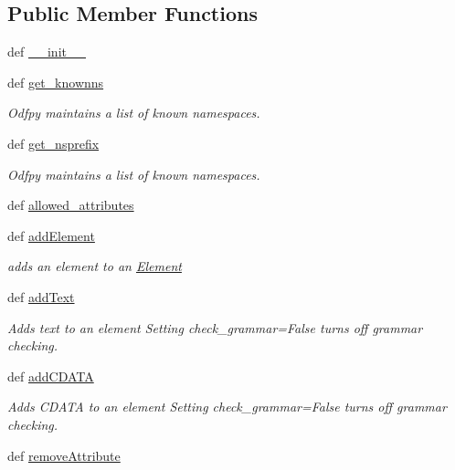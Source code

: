 \subsection*{Public Member Functions}
\begin{DoxyCompactItemize}
\item 
def \hyperlink{classodf_1_1element_1_1Element_aebb50570215d430236d8cfdaa41331d9}{\+\_\+\+\_\+init\+\_\+\+\_\+}
\item 
def \hyperlink{classodf_1_1element_1_1Element_a31ad0b6559d84f55ab508fef095bb2ed}{get\+\_\+knownns}
\begin{DoxyCompactList}\small\item\em Odfpy maintains a list of known namespaces. \end{DoxyCompactList}\item 
def \hyperlink{classodf_1_1element_1_1Element_af1c38c8bca58c0258075cb7a701e8858}{get\+\_\+nsprefix}
\begin{DoxyCompactList}\small\item\em Odfpy maintains a list of known namespaces. \end{DoxyCompactList}\item 
def \hyperlink{classodf_1_1element_1_1Element_aab7cbbc18e5d24d10b0128b6b45e6824}{allowed\+\_\+attributes}
\item 
def \hyperlink{classodf_1_1element_1_1Element_ae819fd7cab6f9cdd69fe886178bc6d10}{add\+Element}
\begin{DoxyCompactList}\small\item\em adds an element to an \hyperlink{classodf_1_1element_1_1Element}{Element} \end{DoxyCompactList}\item 
def \hyperlink{classodf_1_1element_1_1Element_ab8d1a84f94329e980729b5a1fe9f5296}{add\+Text}
\begin{DoxyCompactList}\small\item\em Adds text to an element Setting check\+\_\+grammar=False turns off grammar checking. \end{DoxyCompactList}\item 
def \hyperlink{classodf_1_1element_1_1Element_a513c231914791f9447648a1fdf1ec038}{add\+C\+D\+A\+T\+A}
\begin{DoxyCompactList}\small\item\em Adds C\+D\+A\+T\+A to an element Setting check\+\_\+grammar=False turns off grammar checking. \end{DoxyCompactList}\item 
def \hyperlink{classodf_1_1element_1_1Element_ad42001ec63013f0c4e834c5a42409721}{remove\+Attribute}

\end{DoxyCompactItemize}
